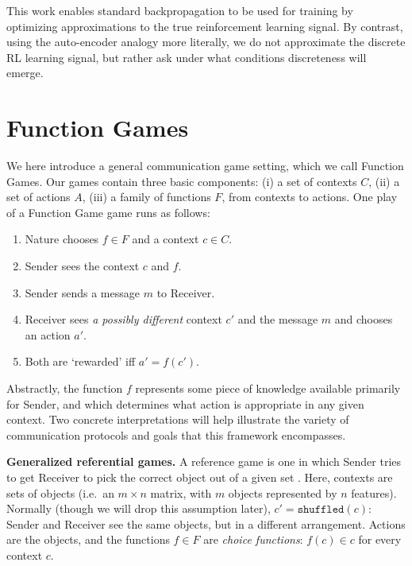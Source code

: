 \documentclass[11pt,a4paper]{article}
\newcommand{\nbSST}[1]{{\leavevmode\color{violet}{\scriptsize#1}}}
\begin{document}
This work enables standard backpropagation to be used for training by optimizing approximations to the true reinforcement learning signal.  By contrast, using the auto-encoder analogy more literally, we do not approximate the discrete RL learning signal, but rather ask under what conditions discreteness will emerge. \nbSST{Probably can be worded better.}

\section{Function Games}

We here introduce a general communication game setting, which we call Function Games.  Our games contain three basic components: (i) a set of contexts $C$, (ii) a set of actions $A$, (iii) a family of functions $F$, from contexts to actions.  One play of a Function Game game runs as follows:
\begin{enumerate}[noitemsep]
	\item Nature chooses $f \in F$ and a context $c \in C$.
	\item Sender sees the context $c$ and $f$.
	\item Sender sends a message $m$ to Receiver.
	\item Receiver sees \emph{a possibly different} context $c'$ and the message $m$ and chooses an action $a'$.
	\item Both are `rewarded' iff $a' = f(c')$.
\end{enumerate}
Abstractly, the function $f$ represents some piece of knowledge available primarily for Sender, and which determines what action is appropriate in any given context. Two concrete interpretations will help illustrate the variety of communication protocols and goals that this framework encompasses.

\noindent \textbf{Generalized referential games.}  A reference game is one in which Sender tries to get Receiver to pick the correct object out of a given set \citep{Skyrms2010, Lazaridou2017, Lazaridou2018, Havrylov2017, Chaabouni2019a}.  Here, contexts are sets of objects (i.e.\ an $m \times n$ matrix, with $m$ objects represented by $n$ features).  Normally (though we will drop this assumption later), $c' = \texttt{shuffled}(c)$: Sender and Receiver see the same objects, but in a different arrangement. Actions are the objects, and the functions $f \in F$ are \emph{choice functions}: $f(c) \in c$ for every context $c$.
\end{document}

